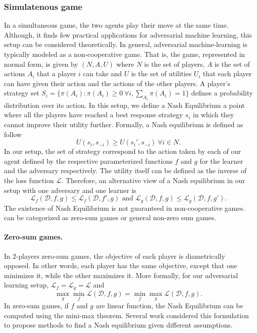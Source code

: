 \subsubsection{Simulatenous game} 
In a simultaneous game, the two agents play their move at the same time. Although, it finds few practical applications for adversarial machine learning, this setup can be considered theoretically. In general, adversarial machine-learning is typically modeled as a non-cooperative game. That is, the game, represented in normal form, is given by $(N, A, U)$ where $N$ is the set of players, $A$ is the set of actions $A_i$ that a player $i$ can take and $U$ is the set of utilities $U_i$ that each player can have given their action and the actions of the other players. A player's strategy set $S_i=\{\pi(A_i):\pi(A_i)\geq 0~\forall i, \sum_{A_i}\pi(A_i)=1\}$ defines a probability distribution over its action. In this setup, we define a Nash Equilibrium a point where all the players have reached a best response strategy $s_i$ in which they cannot improve their utility further. Formally, a Nash equilibrium is defined as follow \[U(s_i, s_{-i})\geq U(s_i',s_{-i})~\forall i\in N.\]
In our setup, the set of strategy correspond to the action taken by each of our agent defined by the respective parameterized functions $f$ and $g$ for the learner and the adversary respectively. The utility itself can be defined as the inverse of the loss function $\mathcal{L}$. Therefore, an alternative view of a Nash equilibrium in our setup with one adversary and one learner is
\[
\mathcal{L}_f(\mathcal{D},f,g)\leq\mathcal{L}_f(\mathcal{D},f',g) \text{ and } \mathcal{L}_g(\mathcal{D}, f,g)\leq\mathcal{L}_g(\mathcal{D},f,g').
\]
The existence of Nash Equilibrium is not guaranteed in non-cooperative games. can be categorized as zero-sum games or general non-zero sum games. \paragraph{Zero-sum games.} In 2-players zero-sum games, the objective of each player is diametrically opposed. In other words, each player has the same objective, except that one minimizes it, while the other maximizes it. More formally, for our adversarial learning setup,  $\mathcal{L}_f=\mathcal{L}_g=\mathcal L$ and
\[
\max_g\min_f\mathcal{L}(\mathcal{D},f,g) = \min_f\max_g \mathcal{L}(\mathcal{D},f,g).
\]
In zero-sum games, if $f$ and $g$ are linear function, the Nash Equilibrium can be computed using the mini-max theorem. Several work considered this formulation to propose methods to find a Nash equilibrium given different assumptions.

